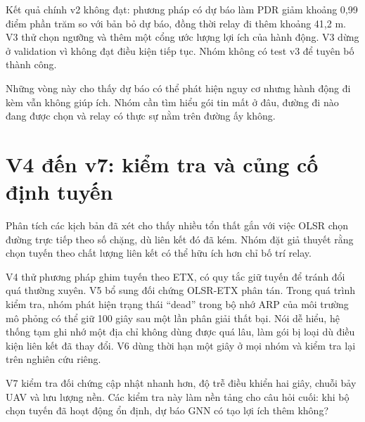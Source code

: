Kết quả chính v2 không đạt: phương pháp có dự báo làm PDR giảm khoảng 0,99 điểm phần trăm so với bản bỏ dự báo, đồng thời relay đi thêm khoảng 41,2 m. V3 thử chọn ngưỡng và thêm một cổng ước lượng lợi ích của hành động. V3 dừng ở validation vì không đạt điều kiện tiếp tục. Nhóm không có test v3 để tuyên bố thành công.

Những vòng này cho thấy dự báo có thể phát hiện nguy cơ nhưng hành động đi kèm vẫn không giúp ích. Nhóm cần tìm hiểu gói tin mất ở đâu, đường đi nào đang được chọn và relay có thực sự nằm trên đường ấy không.

\section{V4 đến v7: kiểm tra và củng cố định tuyến}
Phân tích các kịch bản đã xét cho thấy nhiều tổn thất gắn với việc OLSR chọn đường trực tiếp theo số chặng, dù liên kết đó đã kém. Nhóm đặt giả thuyết rằng chọn tuyến theo chất lượng liên kết có thể hữu ích hơn chỉ bố trí relay.

V4 thử phương pháp ghim tuyến theo ETX, có quy tắc giữ tuyến để tránh đổi quá thường xuyên. V5 bổ sung đối chứng OLSR-ETX phân tán. Trong quá trình kiểm tra, nhóm phát hiện trạng thái ``dead'' trong bộ nhớ ARP của môi trường mô phỏng có thể giữ 100 giây sau một lần phân giải thất bại. Nói dễ hiểu, hệ thống tạm ghi nhớ một địa chỉ không dùng được quá lâu, làm gói bị loại dù điều kiện liên kết đã thay đổi. V6 dùng thời hạn một giây ở mọi nhóm và kiểm tra lại trên nghiên cứu riêng.

V7 kiểm tra đối chứng cập nhật nhanh hơn, độ trễ điều khiển hai giây, chuỗi bảy UAV và lưu lượng nền. Các kiểm tra này làm nền tảng cho câu hỏi cuối: khi bộ chọn tuyến đã hoạt động ổn định, dự báo GNN có tạo lợi ích thêm không?

